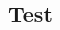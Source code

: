 \documentclass[a4paper,10pt,landscape]{article}
\begin{document}
\begin{multicols*}{3}



\section{Test}

\end{multicols*}
\end{document}
